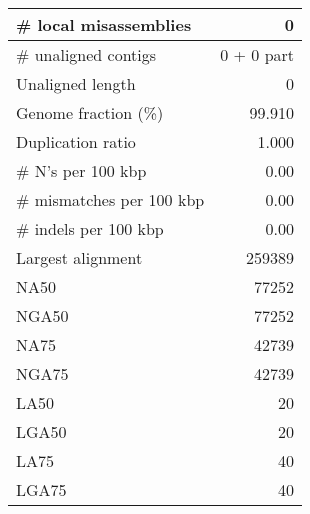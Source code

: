 \documentclass[12pt,a4paper]{article}
\begin{document}
\begin{table}[ht]
\begin{center}
\begin{tabular}{|l*{1}{|r}|}
\# local misassemblies & 0 \\ \hline
\# unaligned contigs & 0 + 0 part \\ \hline
Unaligned length & 0 \\ \hline
Genome fraction (\%) & 99.910 \\ \hline
Duplication ratio & 1.000 \\ \hline
\# N's per 100 kbp & 0.00 \\ \hline
\# mismatches per 100 kbp & 0.00 \\ \hline
\# indels per 100 kbp & 0.00 \\ \hline
Largest alignment & 259389 \\ \hline
NA50 & 77252 \\ \hline
NGA50 & 77252 \\ \hline
NA75 & 42739 \\ \hline
NGA75 & 42739 \\ \hline
LA50 & 20 \\ \hline
LGA50 & 20 \\ \hline
LA75 & 40 \\ \hline
LGA75 & 40 \\ \hline
\end{tabular}
\end{center}
\end{table}
\end{document}
